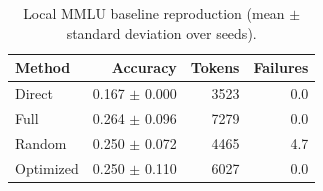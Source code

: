 \begin{table}[t]
\centering
\caption{Local MMLU baseline reproduction (mean $\pm$ standard deviation over seeds).}
\label{tab:baseline-results}
\small
\begin{tabular}{lrrr}
\hline
Method & Accuracy & Tokens & Failures \\
\hline
Direct & 0.167 $\pm$ 0.000 & 3523 & 0.0 \\
Full & 0.264 $\pm$ 0.096 & 7279 & 0.0 \\
Random & 0.250 $\pm$ 0.072 & 4465 & 4.7 \\
Optimized & 0.250 $\pm$ 0.110 & 6027 & 0.0 \\
\hline
\end{tabular}
\end{table}
